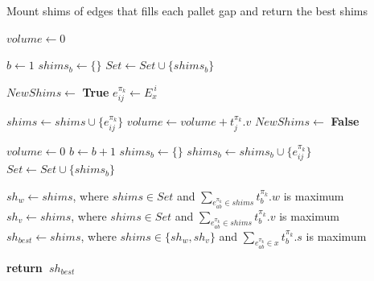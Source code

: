 \documentclass[preprint,authoryear]{elsarticle}
\renewcommand{\Return}{\State \bf {return}~}
\begin{document}
\begin{algorithm}[H]
	\caption{Mount shims of edges that fills each pallet gap and return the best shims}  \label{alg:getBestShims}
	\begin{algorithmic}[1]
		
		
		\State $volume \gets 0$	
		
		\State $b \gets 1$
		\State $shims_b \gets \{\}$  \label{empty_shims}
		\State $Set \gets Set \cup \{shims_b\}$ \label{empty_set}
		
		 \label{edges_indexes}
		
		
		\State $NewShims \gets$ {\bf True} \label{new_shims}
		\State $e_{ij}^{\pi_k} \gets E_x^{\ i}$
		
		 \label{shims_set}
		
		
		
		\State $shims \gets shims \cup \{e_{ij}^{\pi_k}\}$
		\State $volume \gets volume + t_j^{\pi_k}.v$
		\State $NewShims \gets$ {\bf False} \label{new_shims_false}
		
		
		\EndIf
		
		\EndFor 
		
		 \label{new_shims2}
		\State $volume \gets 0$
		\State $b \gets b + 1$
		\State $shims_b \gets \{\}$
		\State $shims_b \gets shims_b \cup \{e_{ij}^{\pi_k}\}$
		\State $Set \gets Set \cup \{shims_b\}$
		\EndIf
		
		\EndFor 
		
		\State $sh_w \gets shims$, where $shims \in Set$ and $\sum_{e_{ab}^{\pi_k} \in shims} t_b^{\pi_k}.w$ is maximum  \label{best_weight}		
		\State $sh_v \gets shims$, where $shims \in Set$ and $\sum_{e_{ab}^{\pi_k} \in shims} t_b^{\pi_k}.v$ is maximum \label{best_volume}
		\State $sh_{best} \gets shims$, where $shims \in \{sh_w, sh_v\}$ and $\sum_{e_{ab}^{\pi_k} \in x} t_b^{\pi_k}.s$ is maximum \label{best_score}
		
		\Return $sh_{best}$
		
		\EndProcedure
		
	\end{algorithmic}
\end{algorithm}
\end{document}
